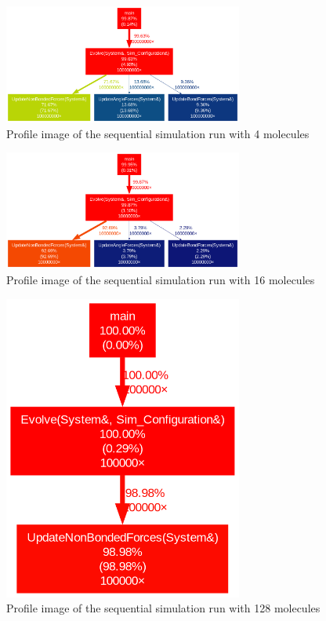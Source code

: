 \documentclass{article}
\begin{document}
\begin{figure}
    \includegraphics[width=0.7\textwidth]{Images/vec_4mol_profile.png}
    \centering
    \caption{Profile image of the sequential simulation run with 4 molecules}
    \label{fig: seq profile 4 molecule}
\end{figure}
\begin{figure}
    \includegraphics[width=0.7\textwidth]{Images/seq_16mol_profile.png
    }
    \centering
    \caption{Profile image of the sequential simulation run with 16 molecules}
    \label{fig: seq profile 16 molecule}
\end{figure}
\begin{figure}
    \includegraphics[height=0.5\textheight,width=0.7\textwidth]{Images/seq_128mol_profile.png
    }
    \centering
    \caption{Profile image of the sequential simulation run with 128 molecules}
    \label{fig: seq profile 128 molecule}
\end{figure}
\end{document}
